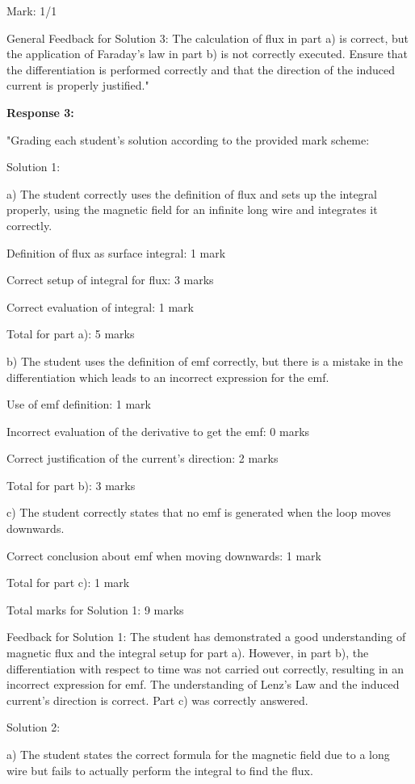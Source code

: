 \documentclass[a4paper,11pt]{article}
\begin{document}
Mark: 1/1

General Feedback for Solution 3: The calculation of flux in part a) is correct, but the application of Faraday's law in part b) is not correctly executed. Ensure that the differentiation is performed correctly and that the direction of the induced current is properly justified."

\textbf{Response 3:}

"Grading each student's solution according to the provided mark scheme:

Solution 1:

a) The student correctly uses the definition of flux and sets up the integral properly, using the magnetic field for an infinite long wire and integrates it correctly.

Definition of flux as surface integral: 1 mark

Correct setup of integral for flux: 3 marks

Correct evaluation of integral: 1 mark

Total for part a): 5 marks

b) The student uses the definition of emf correctly, but there is a mistake in the differentiation which leads to an incorrect expression for the emf.

Use of emf definition: 1 mark

Incorrect evaluation of the derivative to get the emf: 0 marks

Correct justification of the current's direction: 2 marks

Total for part b): 3 marks

c) The student correctly states that no emf is generated when the loop moves downwards.

Correct conclusion about emf when moving downwards: 1 mark

Total for part c): 1 mark

Total marks for Solution 1: 9 marks

Feedback for Solution 1:
The student has demonstrated a good understanding of magnetic flux and the integral setup for part a). However, in part b), the differentiation with respect to time was not carried out correctly, resulting in an incorrect expression for emf. The understanding of Lenz's Law and the induced current's direction is correct. Part c) was correctly answered.

Solution 2:

a) The student states the correct formula for the magnetic field due to a long wire but fails to actually perform the integral to find the flux.
\end{document}

